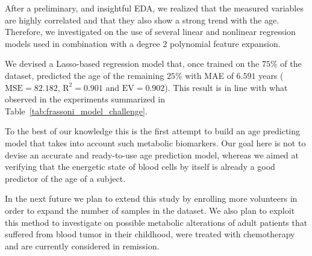 After a preliminary, and insightful EDA, we realized that the measured variables are highly correlated and that they also show a strong trend with the age. Therefore, we investigated on the use of several linear and nonlinear regression models used in combination with a degree $2$ polynomial feature expansion.

We devised a Lasso-based regression model that, once trained on the $75\%$ of the dataset, predicted the age of the remaining $25\%$ with MAE of $6.591$ years ($\text{MSE}=82.182$, $\text{R}^2=0.901$ and $\text{EV}=0.902$). This result is in line with what observed in the experiments summarized in Table~\ref{tab:frassoni_model_challenge}.

To the best of our knowledge this is the first attempt to build an age predicting model that takes into account such metabolic biomarkers.
Our goal here is not to devise an accurate and ready-to-use age prediction model, whereas we aimed at verifying that the energetic state of blood cells by itself is already a good predictor of the age of a subject.

In the next future we plan to extend this study by enrolling more volunteers in order to expand the number of samples in the dataset.
We also plan to exploit this method to investigate on possible metabolic alterations of adult patients that suffered from blood tumor in their childhood, were treated with chemotherapy and are currently considered in remission.






























